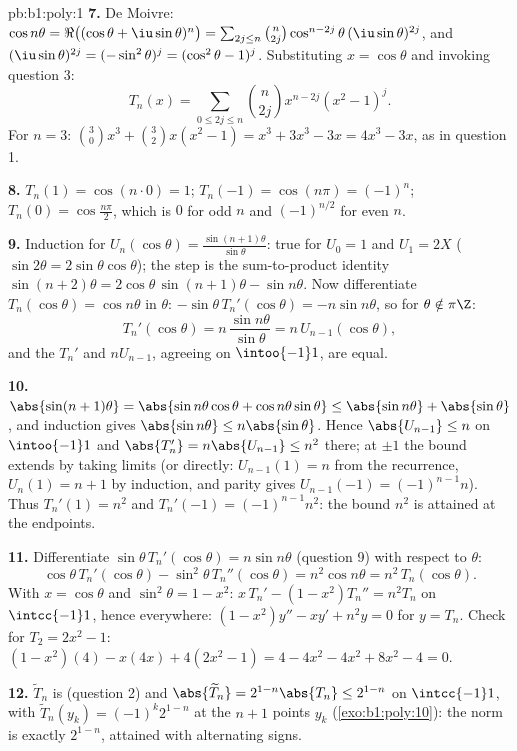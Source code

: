 \begin{solution}{pb:b1:poly:1}
\textbf{7.} De Moivre: $\cos n\theta = \Re\bigl((\cos\theta +
\iu\sin\theta)^n\bigr) = \sum_{2j \leq n}\binom n{2j}
\cos^{n-2j}\theta\,(\iu\sin\theta)^{2j}$, and $(\iu\sin\theta)^{2j}
= (-\sin^2\theta)^j = (\cos^2\theta - 1)^j$. Substituting $x =
\cos\theta$ and invoking question 3:
\[
T_n(x) = \sum_{0\leq 2j\leq n}\binom n{2j}x^{n-2j}(x^2 - 1)^j .
\]
For $n = 3$: $\binom30 x^3 + \binom32 x(x^2 - 1) = x^3 + 3x^3 -
3x = 4x^3 - 3x$, as in question 1.

\textbf{8.} $T_n(1) = \cos(n\cdot0) = 1$; $T_n(-1) = \cos(n\pi) =
(-1)^n$; $T_n(0) = \cos\frac{n\pi}2$, which is $0$ for odd $n$ and
$(-1)^{n/2}$ for even $n$.

\textbf{9.} Induction for $U_n(\cos\theta) =
\frac{\sin(n+1)\theta}{\sin\theta}$: true for $U_0 = 1$ and $U_1 =
2X$ ($\sin2\theta = 2\sin\theta\cos\theta$); the step is the
sum-to-product identity $\sin(n+2)\theta = 2\cos\theta\,
\sin(n+1)\theta - \sin n\theta$. Now differentiate
$T_n(\cos\theta) = \cos n\theta$ in $\theta$:
$-\sin\theta\,T_n'(\cos\theta) = -n\sin n\theta$, so for $\theta
\notin \pi\Z$:
\[
T_n'(\cos\theta) = n\,\frac{\sin n\theta}{\sin\theta}
= n\,U_{n-1}(\cos\theta) ,
\]
and the  $T_n'$ and $nU_{n-1}$, agreeing on
$\intoo{-1}1$, are equal.

\textbf{10.} $\abs{\sin(n+1)\theta} = \abs{\sin n\theta\cos\theta
+ \cos n\theta\sin\theta} \leq \abs{\sin n\theta} +
\abs{\sin\theta}$, and induction gives $\abs{\sin n\theta} \leq
n\abs{\sin\theta}$. Hence $\abs{U_{n-1}} \leq n$ on $\intoo{-1}1$
and $\abs{T_n'} = n\abs{U_{n-1}} \leq n^2$ there; at $\pm1$ the
bound extends by taking limits (or directly: $U_{n-1}(1) = n$ from
the recurrence, $U_n(1) = n + 1$ by induction, and parity gives
$U_{n-1}(-1) = (-1)^{n-1}n$). Thus $T_n'(1) = n^2$ and $T_n'(-1)
= (-1)^{n-1}n^2$: the bound $n^2$ is attained at the endpoints.

\textbf{11.} Differentiate $\sin\theta\,T_n'(\cos\theta) = n\sin
n\theta$ (question 9) with respect to $\theta$:
\[
\cos\theta\,T_n'(\cos\theta) - \sin^2\theta\,T_n''(\cos\theta)
= n^2\cos n\theta = n^2\,T_n(\cos\theta) .
\]
With $x = \cos\theta$ and $\sin^2\theta = 1 - x^2$: $x\,T_n' - (1
- x^2)T_n'' = n^2T_n$ on $\intcc{-1}1$, hence everywhere:
$(1 - x^2)y'' - xy' + n^2y = 0$ for $y = T_n$. Check for $T_2 =
2x^2 - 1$: $(1 - x^2)(4) - x(4x) + 4(2x^2 - 1) = 4 - 4x^2 - 4x^2
+ 8x^2 - 4 = 0$.

\textbf{12.} $\widetilde T_n$ is  (question 2) and
$\abs{\widetilde T_n} = 2^{1-n}\abs{T_n} \leq 2^{1-n}$ on
$\intcc{-1}1$, with $\widetilde T_n(y_k) = (-1)^k2^{1-n}$ at the
$n + 1$ points $y_k$ (\cref{exo:b1:poly:10}): the norm is exactly
$2^{1-n}$, attained with alternating signs.


\end{solution}
